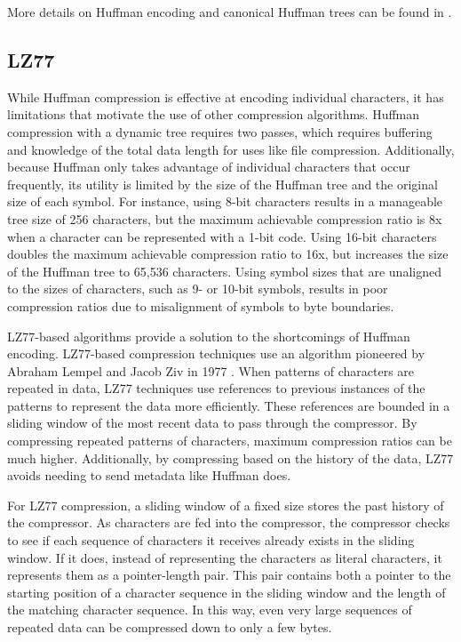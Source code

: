 \documentclass[doublespace,nopageskip]{VTthesis}
\begin{document}
More details on Huffman encoding and canonical Huffman trees can be found in \cite{huffman, canonicalhuffman}.

\subsection{LZ77}\label{ss:lz77}
While Huffman compression is effective at encoding individual characters, it has limitations that motivate the use of other compression algorithms. Huffman compression with a dynamic tree requires two passes, which requires buffering and knowledge of the total data length for uses like file compression. Additionally, because Huffman only takes advantage of individual characters that occur frequently, its utility is limited by the size of the Huffman tree and the original size of each symbol. For instance, using 8-bit characters results in a manageable tree size of 256 characters, but the maximum achievable compression ratio is 8x when a character can be represented with a 1-bit code. Using 16-bit characters doubles the maximum achievable compression ratio to 16x, but increases the size of the Huffman tree to 65,536 characters. Using symbol sizes that are unaligned to the sizes of characters, such as 9- or 10-bit symbols, results in poor compression ratios due to misalignment of symbols to byte boundaries.

LZ77-based algorithms provide a solution to the shortcomings of Huffman encoding. LZ77-based compression techniques use an algorithm pioneered by Abraham Lempel and Jacob Ziv in 1977 \cite{lz77}. When patterns of characters are repeated in data, LZ77 techniques use references to previous instances of the patterns to represent the data more efficiently. These references are bounded in a sliding window of the most recent data to pass through the compressor. By compressing repeated patterns of characters, maximum compression ratios can be much higher. Additionally, by compressing based on the history of the data, LZ77 avoids needing to send metadata like Huffman does.

For LZ77 compression, a sliding window of a fixed size stores the past history of the compressor. As characters are fed into the compressor, the compressor checks to see if each sequence of characters it receives already exists in the sliding window. If it does, instead of representing the characters as literal characters, it represents them as a pointer-length pair. This pair contains both a pointer to the starting position of a character sequence in the sliding window and the length of the matching character sequence. In this way, even very large sequences of repeated data can be compressed down to only a few bytes.
\end{document}
